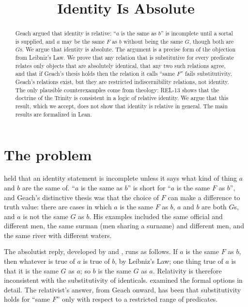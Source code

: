 \documentclass{situationist-preprint}
\title{Identity Is Absolute}
\begin{document}
\maketitle

\begin{abstract}
Geach argued that identity is relative: \enquote{$a$ is the same as $b$} is incomplete until a sortal is supplied, and $a$ may be the same $F$ as $b$ without being the same $G$, though both are $G$s. We argue that identity is absolute. The argument is a precise form of the objection from Leibniz's Law. We prove that any relation that is substitutive for every predicate relates only objects that are absolutely identical, that any two such relations agree, and that if Geach's thesis holds then the relation it calls \enquote{same $F$} fails substitutivity. Geach's relations exist, but they are restricted indiscernibility relations, not identity. The only plausible counterexamples come from theology: REL-13 shows that the doctrine of the Trinity is consistent in a logic of relative identity. We argue that this result, which we accept, does not show that identity is relative in general. The main results are formalized in Lean.
\end{abstract}

\section{The problem}

\citet{Geach1962,Geach1967} held that an identity statement is incomplete unless it says what kind of thing $a$ and $b$ are the same of. \enquote{$a$ is the same as $b$} is short for \enquote{$a$ is the same $F$ as $b$}, and Geach's distinctive thesis was that the choice of $F$ can make a difference to truth value: there are cases in which $a$ is the same $F$ as $b$, $a$ and $b$ are both $G$s, and $a$ is not the same $G$ as $b$. His examples included the same official and different men, the same surman (men sharing a surname) and different men, and the same river with different waters.

The absolutist reply, developed by \citet{Perry1970} and \citet{Wiggins2001}, runs as follows. If $a$ is the same $F$ as $b$, then whatever is true of $a$ is true of $b$, by Leibniz's Law; one thing true of $a$ is that it is the same $G$ as $a$; so $b$ is the same $G$ as $a$. Relativity is therefore inconsistent with the substitutivity of identicals. \citet{Griffin1977} examined the formal options in detail. The relativist's answer, from Geach onward, has been that substitutivity holds for \enquote{same $F$} only with respect to a restricted range of predicates.
\end{document}
